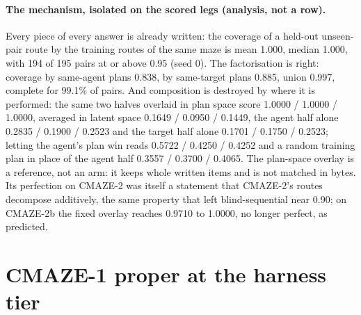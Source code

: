 \documentclass{article} %
\begin{document}
\paragraph{The mechanism, isolated on the scored legs (analysis, not a row).} Every piece of every
answer is already written: the coverage of a held-out unseen-pair route by the training routes of
the same maze is mean 1.000, median 1.000, with 194 of 195 pairs at or above 0.95 (seed 0). The
factorisation is right: coverage by same-agent plans 0.838, by same-target plans 0.885, union
0.997, complete for 99.1\% of pairs. And composition is destroyed by where it is performed: the
same two halves overlaid in plan space score 1.0000 / 1.0000 / 1.0000, averaged in latent space
0.1649 / 0.0950 / 0.1449, the agent half alone 0.2835 / 0.1900 / 0.2523 and the target half alone
0.1701 / 0.1750 / 0.2523; letting the agent's plan win reads 0.5722 / 0.4250 / 0.4252 and a random
training plan in place of the agent half 0.3557 / 0.3700 / 0.4065. %
The plan-space overlay is a reference, not an arm: it keeps whole written items and is not matched
in bytes. Its perfection on CMAZE-2 was itself a statement that CMAZE-2's routes decompose
additively, the same property that left blind-sequential near 0.90; on CMAZE-2b the fixed overlay
reaches 0.9710 to 1.0000, no longer perfect, as predicted. %

\section{CMAZE-1 proper at the harness tier}
\label{app:cmaze1}
\end{document}
